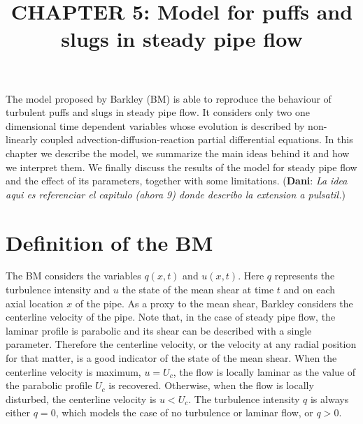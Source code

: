 \documentclass{article}
\title{CHAPTER 5: Model for puffs and slugs in steady pipe flow}
\date{}
\DeclareRobustCommand{\dm}[1]{{\color{blue}(\textbf{Dani}: \textit{#1}\xspace)}}
\begin{document}
\maketitle
The model proposed by Barkley \cite{barkley2011modeling} (BM) is able to reproduce the behaviour of turbulent puffs and slugs in steady pipe flow. It considers only two one dimensional time dependent variables whose evolution is described by non-linearly coupled advection-diffusion-reaction partial differential equations. In this chapter we describe the model, we summarize the main ideas behind it and how we interpret them. We finally discuss the results of the model for steady pipe flow and the effect of its parameters, together with some limitations. \dm{La idea aqui es referenciar el capitulo (ahora 9) donde describo la extension a pulsatil.}




\section{Definition of the BM}
The BM considers the variables $q\left(x,t\right)$ and $u\left(x,t\right)$. Here $q$ represents the turbulence intensity and $u$ the state of the mean shear at time $t$ and on each axial location $x$ of the pipe. As a proxy to the mean shear, Barkley considers the centerline velocity of the pipe. Note that, in the case of steady pipe flow, the laminar profile is parabolic and its shear can be described with a single parameter. Therefore the centerline velocity, or the velocity at any radial position for that matter, is a good indicator of the state of the mean shear. When the centerline velocity is maximum, $u=U_{c}$, the flow is locally laminar as the value of the parabolic profile $U_{c}$ is recovered. Otherwise, when the flow is locally disturbed, the centerline velocity is $u < U_{c}$. The turbulence intensity $q$ is always either $q=0$, which models the case of no turbulence or laminar flow, or $q>0$. 
\end{document}
